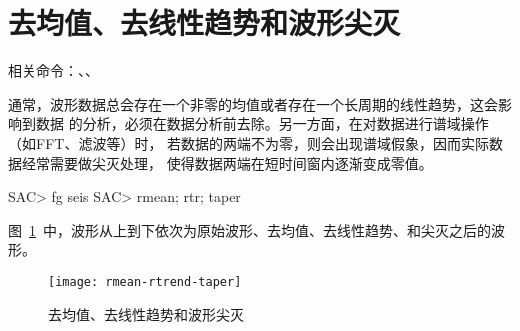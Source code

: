 \section{去均值、去线性趋势和波形尖灭}
相关命令：、、

通常，波形数据总会存在一个非零的均值或者存在一个长周期的线性趋势，这会影响到数据
的分析，必须在数据分析前去除。另一方面，在对数据进行谱域操作（如FFT、滤波等）时，
若数据的两端不为零，则会出现谱域假象，因而实际数据经常需要做尖灭处理，
使得数据两端在短时间窗内逐渐变成零值。

\begin{SACCode}
SAC> fg seis
SAC> rmean; rtr; taper
\end{SACCode}

图~\ref{fig:rmean-rtrend-taper}~中，波形从上到下依次为原始波形、去均值、去线性趋势、和尖灭之后的波形。

\begin{figure}[H]
\centering
\texttt{[image: rmean-rtrend-taper]}
\caption{去均值、去线性趋势和波形尖灭}
\label{fig:rmean-rtrend-taper}
\end{figure}
